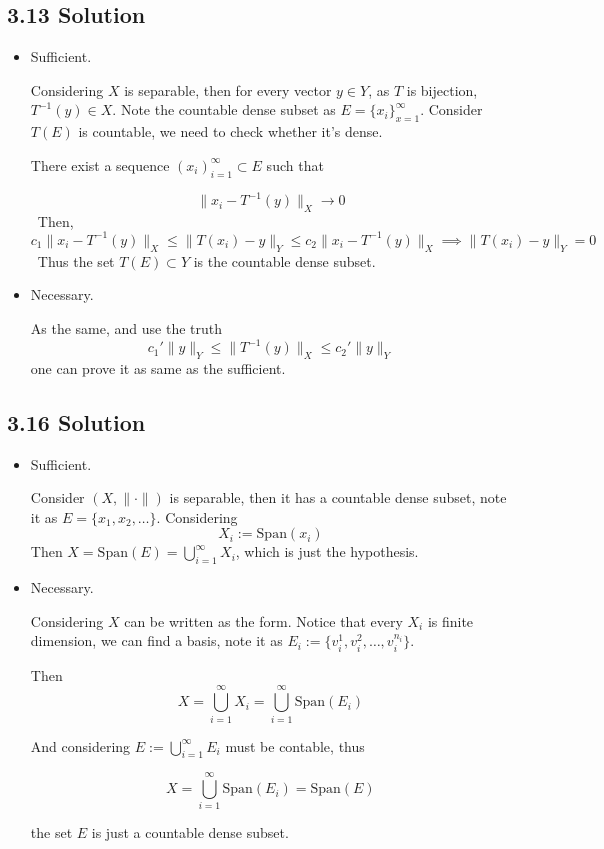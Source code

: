 \documentclass{article}
\begin{document}
\subsection*{3.13 Solution}
\begin{itemize}
    \item Sufficient.
    
    Considering \(X\) is separable, then for every vector \(y \in Y\), as \(T\) is bijection, \(T^{-1}(y) \in X\). Note the countable dense subset as \(E = \{x_i\}_{x = 1}^\infty\). Consider \(T(E)\) is countable, we need to check whether it's dense.
    
    There exist a sequence \((x_i)_{i = 1}^{\infty} \subset E\) such that
    
    \[\|x_i - T^{-1}(y)\|_X \to 0\]
    \
    Then,
    \[c_1 \|x_i - T^{-1}(y)\|_X \le \|T(x_i) - y\|_Y \le c_2 \|x_i - T^{-1}(y)\|_X \implies \|T(x_i) - y\|_Y = 0\]
    \
    Thus the set \(T(E) \subset Y\) is the countable dense subset.

    \item Necessary.
    
    As the same, and use the truth
    \[c_1' \|y\|_Y \le \|T^{-1}(y)\|_X \le c_2' \|y\|_Y \]
    one can prove it as same as the sufficient.
\end{itemize}




\subsection*{3.16 Solution}

\begin{itemize}
    \item Sufficient.
    
    Consider \((X, \|\cdot\|)\) is separable, then it has a countable dense subset, note it as \(E = \{x_1, x_2, \ldots\}\). Considering 
    \[X_i := \mathrm{Span}(x_i)\]
    Then \(X = \mathrm{Span}(E) = \bigcup_{i = 1}^\infty X_i\), which is just the hypothesis.

    \item Necessary.
    
    Considering \(X\) can be written as the form. Notice that every \(X_i\) is finite dimension, we can find a basis, note it as \(E_i := \{v_i^1, v_i^2, \ldots, v_i^{n_i}\}\). 
    
    Then
    \[X = \bigcup_{i = 1}^\infty X_i = \bigcup_{i = 1}^\infty \mathrm{Span}(E_i)\]

    And considering \(E := \bigcup_{i = 1}^\infty E_i\) must be contable, thus

    \[X = \bigcup_{i = 1}^\infty \mathrm{Span}(E_i) = \mathrm{Span}(E)\]

    the set \(E\) is just a countable dense subset.
\end{itemize}
\end{document}
